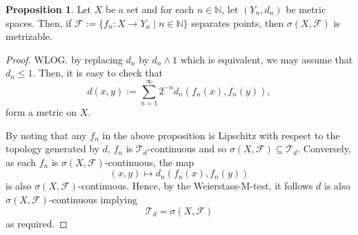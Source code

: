 \documentclass[]{article}
\theoremstyle{definition}
\newtheorem{proposition}{Proposition}[section]
\begin{document}
\begin{proposition}
  Let \(X\) be a set and for each \(n \in \mathbb{N}\), let \((Y_n, d_n)\) be metric spaces. Then, if 
  \(\mathcal{F} := \{f_n : X \to Y_n \mid n \in \mathbb{N}\}\) separates points, then \(\sigma(X, \mathcal{F})\)
  is metrizable.
\end{proposition}
\begin{proof}
  WLOG. by replacing \(d_n\) by \(d_n \wedge 1\) which is equivalent, we may assume that \(d_n \le 1\). 
  Then, it is easy to check that 
  \[d(x, y) := \sum_{n = 1}^\infty 2^{-n} d_n(f_n(x), f_n(y)),\]
  form a metric on \(X\). 

  By noting that any \(f_n\) in the above proposition is Lipschitz with respect to the topology generated 
  by \(d\), \(f_n\) is \(\mathcal{T}_d\)-continuous and so \(\sigma(X, \mathcal{F}) \subseteq \mathcal{T}_d\). Conversely, 
  as each \(f_n\) is \(\sigma(X, \mathcal{F})\)-continuous, the map 
  \[(x, y) \mapsto d_n(f_n(x), f_n(y))\]
  is also \(\sigma(X, \mathcal{F})\)-continuous. Hence, by the Weierstass-M-test, it follows \(d\) is also 
  \(\sigma(X, \mathcal{F})\)-continuous implying 
  \[\mathcal{T}_d = \sigma(X, \mathcal{F})\]
  as required.
\end{proof}
\end{document}

